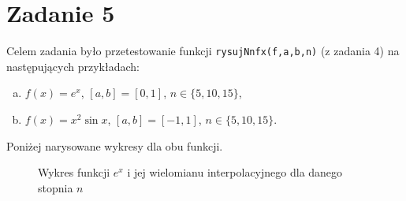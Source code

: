 \documentclass[]{article}
\begin{document}
	
	\section*{Zadanie 5}
	Celem zadania było przetestowanie funkcji \texttt{rysujNnfx(f,a,b,n)} (z zadania 4) na następujących przykładach:
	\begin{enumerate}[(a)]
		\item $f(x) = e^x$, $[a, b] = [0,1]$, $n \in \{5,10,15\}$,
		\item $f(x) = x^2\sin{x}$, $[a, b] = [-1,1]$, $n \in \{5,10,15\}$.
	\end{enumerate}
	Poniżej narysowane wykresy dla obu funkcji.
	
		\begin{figure}[!htbp]
	\centering
	 \hfill
	 \hfill
	 \hfill
	\caption*{Wykres funkcji $e^{x}$ i jej wielomianu interpolacyjnego dla danego stopnia $n$}
\end{figure}		
\end{document}
